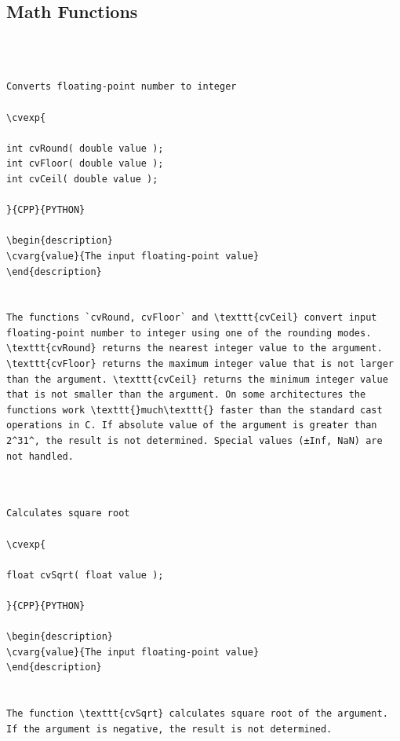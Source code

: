 \subsection{Math Functions}
\begin{verbatim}


\end{verbatim}
\label{Round, Floor, Ceil}
\begin{verbatim}

Converts floating-point number to integer

\cvexp{

int cvRound( double value );
int cvFloor( double value );
int cvCeil( double value );

}{CPP}{PYTHON}

\begin{description}
\cvarg{value}{The input floating-point value}
\end{description}


The functions `cvRound, cvFloor` and \texttt{cvCeil} convert input floating-point number to integer using one of the rounding modes. \texttt{cvRound} returns the nearest integer value to the argument. \texttt{cvFloor} returns the maximum integer value that is not larger than the argument. \texttt{cvCeil} returns the minimum integer value that is not smaller than the argument. On some architectures the functions work \texttt{}much\texttt{} faster than the standard cast operations in C. If absolute value of the argument is greater than 2^31^, the result is not determined. Special values (±Inf, NaN) are not handled.


\end{verbatim}
\label{Sqrt}
\begin{verbatim}

Calculates square root

\cvexp{

float cvSqrt( float value );

}{CPP}{PYTHON}

\begin{description}
\cvarg{value}{The input floating-point value}
\end{description}


The function \texttt{cvSqrt} calculates square root of the argument. If the argument is negative, the result is not determined.


\end{verbatim}
\label{InvSqrt}

